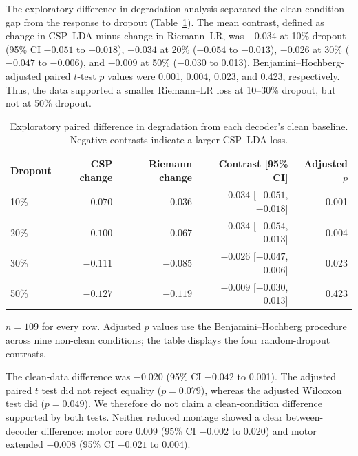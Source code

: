 \documentclass[11pt]{article}
\begin{document}
The exploratory difference-in-degradation analysis separated the clean-condition gap from the response to dropout (Table~\ref{tab:degradation-contrast}). The mean contrast, defined as change in CSP--LDA minus change in Riemann--LR, was $-0.034$ at 10\% dropout (95\% CI $-0.051$ to $-0.018$), $-0.034$ at 20\% ($-0.054$ to $-0.013$), $-0.026$ at 30\% ($-0.047$ to $-0.006$), and $-0.009$ at 50\% ($-0.030$ to 0.013). Benjamini--Hochberg-adjusted paired $t$-test $p$ values were 0.001, 0.004, 0.023, and 0.423, respectively. Thus, the data supported a smaller Riemann--LR loss at 10--30\% dropout, but not at 50\% dropout.

\begin{table}[t]
\centering
\caption{Exploratory paired difference in degradation from each decoder's clean baseline. Negative contrasts indicate a larger CSP--LDA loss.}
\label{tab:degradation-contrast}
\begin{threeparttable}
\small
\begin{tabular}{lrrrr}
\toprule
Dropout & CSP change & Riemann change & Contrast [95\% CI] & Adjusted $p$ \\
\midrule
10\% & $-0.070$ & $-0.036$ & $-0.034$ [$-0.051$, $-0.018$] & 0.001 \\
20\% & $-0.100$ & $-0.067$ & $-0.034$ [$-0.054$, $-0.013$] & 0.004 \\
30\% & $-0.111$ & $-0.085$ & $-0.026$ [$-0.047$, $-0.006$] & 0.023 \\
50\% & $-0.127$ & $-0.119$ & $-0.009$ [$-0.030$, 0.013] & 0.423 \\
\bottomrule
\end{tabular}
\begin{tablenotes}\footnotesize
\item $n=109$ for every row. Adjusted $p$ values use the Benjamini--Hochberg procedure across nine non-clean conditions; the table displays the four random-dropout contrasts.
\end{tablenotes}
\end{threeparttable}
\end{table}

The clean-data difference was $-0.020$ (95\% CI $-0.042$ to 0.001). The adjusted paired $t$ test did not reject equality ($p=0.079$), whereas the adjusted Wilcoxon test did ($p=0.049$). We therefore do not claim a clean-condition difference supported by both tests. Neither reduced montage showed a clear between-decoder difference: motor core 0.009 (95\% CI $-0.002$ to 0.020) and motor extended $-0.008$ (95\% CI $-0.021$ to 0.004).
\end{document}
